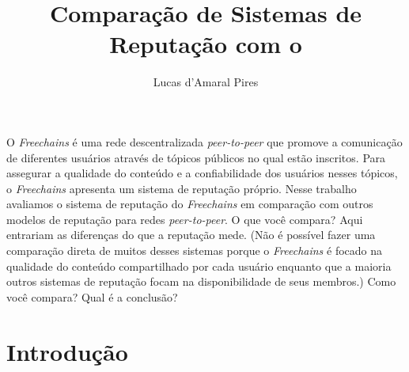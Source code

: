 \documentclass[12pt]{article}
\title{Comparação de Sistemas de Reputação com o \FC}
\author{Lucas d'Amaral Pires\inst{1}}
\newcommand{\FC} {\emph{Freechains}\xspace}
\newcommand{\PtoP} {\emph{peer-to-peer}\xspace}
\begin{document}
 

\maketitle




\begin{resumo} 

O \FC é uma rede descentralizada \PtoP que promove a comunicação de diferentes usuários através de tópicos públicos no qual estão inscritos.  Para assegurar a qualidade do conteúdo e a confiabilidade dos usuários nesses tópicos, o \FC apresenta um sistema de reputação próprio.  Nesse trabalho avaliamos o sistema de reputação do \FC em comparação com outros modelos de reputação para redes \PtoP.  O que você compara? Aqui entrariam as diferenças do que a reputação mede.  (Não é possível fazer uma comparação direta de muitos desses sistemas porque o \FC é focado na qualidade do conteúdo compartilhado por cada usuário enquanto que a maioria outros sistemas de reputação focam na disponibilidade de seus membros.) Como você compara?  Qual é a conclusão?
  
\end{resumo}


\section{Introdução} \label{sec:intro}

\end{document}
